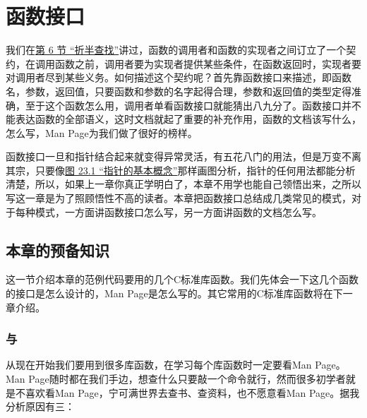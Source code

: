 

\chapter{函数接口}
%
我们在\hyperlink{db.ch11s06.id2746698}{第 6 节 “折半查找”}讲过，函数的调用者和函数的实现者之间订立了一个契约，在调用函数之前，调用者要为实现者提供某些条件，在函数返回时，实现者要对调用者尽到某些义务。如何描述这个契约呢？首先靠函数接口来描述，即函数名，参数，返回值，只要函数和参数的名字起得合理，参数和返回值的类型定得准确，至于这个函数怎么用，调用者单看函数接口就能猜出八九分了。函数接口并不能表达函数的全部语义，这时文档就起了重要的补充作用，函数的文档该写什么，怎么写，Man Page为我们做了很好的榜样。



函数接口一旦和指针结合起来就变得异常灵活，有五花八门的用法，但是万变不离其宗，只要像\hyperlink{db.ch23s01.id2810538}{图 23.\BookSplit{}1 “指针的基本概念”}那样画图分析，指针的任何用法都能分析清楚，所以，如果上一章你真正学明白了，本章不用学也能自己领悟出来，之所以写这一章是为了照顾悟性不高的读者。本章把函数接口总结成几类常见的模式，对于每种模式，一方面讲函数接口怎么写，另一方面讲函数的文档怎么写。




\section{本章的预备知识}
%
这一节介绍本章的范例代码要用的几个C标准库函数。我们先体会一下这几个函数的接口是怎么设计的，Man Page是怎么写的。其它常用的C标准库函数将在下一章介绍。


\subsection{与}
%


从现在开始我们要用到很多库函数，在学习每个库函数时一定要看Man Page。Man Page随时都在我们手边，想查什么只要敲一个命令就行，然而很多初学者就是不喜欢看Man Page，宁可满世界去查书、查资料，也不愿意看Man Page。据我分析原因有三：


